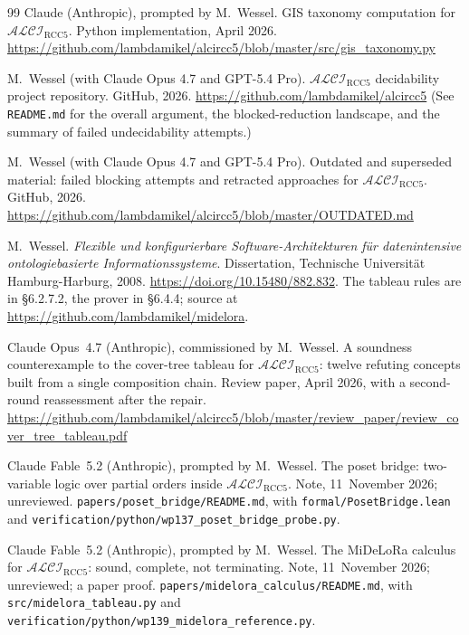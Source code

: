 \documentclass[11pt]{article}
\newcommand{\ALCIRCC}[1]{\mathcal{ALCI}_{\mathrm{RCC#1}}}
\theoremstyle{plain}
\theoremstyle{definition}
\begin{document}
\begin{thebibliography}{99}
Claude (Anthropic), prompted by M.\ Wessel.
\newblock GIS taxonomy computation for $\ALCIRCC{5}$.
\newblock Python implementation, April 2026.
\newblock \url{https://github.com/lambdamikel/alcircc5/blob/master/src/gis_taxonomy.py}


M.\ Wessel (with Claude Opus 4.7 and GPT-5.4 Pro).
\newblock $\ALCIRCC{5}$ decidability project repository.
\newblock GitHub, 2026.
\newblock \url{https://github.com/lambdamikel/alcircc5}
\newblock (See \texttt{README.md} for the overall argument, the
  blocked-reduction landscape, and the summary of failed
  undecidability attempts.)

M.\ Wessel (with Claude Opus 4.7 and GPT-5.4 Pro).
\newblock Outdated and superseded material: failed blocking
  attempts and retracted approaches for $\ALCIRCC{5}$.
\newblock GitHub, 2026.
\newblock \url{https://github.com/lambdamikel/alcircc5/blob/master/OUTDATED.md}

M.\ Wessel.
\newblock \emph{Flexible und konfigurierbare Software-Architekturen f\"ur
  datenintensive ontologiebasierte Informationssysteme}.
\newblock Dissertation, Technische Universit\"at Hamburg-Harburg, 2008.
\newblock \url{https://doi.org/10.15480/882.832}. The tableau rules are in
  \S6.2.7.2, the prover in \S6.4.4; source at
  \url{https://github.com/lambdamikel/midelora}.

Claude Opus~4.7 (Anthropic), commissioned by M.\ Wessel.
\newblock A soundness counterexample to the cover-tree tableau for
  $\ALCIRCC{5}$: twelve refuting concepts built from a single composition
  chain.
\newblock Review paper, April 2026, with a second-round reassessment after
  the repair.
\newblock \url{https://github.com/lambdamikel/alcircc5/blob/master/review_paper/review_cover_tree_tableau.pdf}

Claude Fable~5.2 (Anthropic), prompted by M.\ Wessel.
\newblock The poset bridge: two-variable logic over partial orders inside
  $\ALCIRCC{5}$.
\newblock Note, 11~November 2026; unreviewed.
\newblock \texttt{papers/poset\_bridge/README.md}, with
  \texttt{formal/PosetBridge.lean} and
  \texttt{verification/python/wp137\_poset\_bridge\_probe.py}.

Claude Fable~5.2 (Anthropic), prompted by M.\ Wessel.
\newblock The MiDeLoRa calculus for $\ALCIRCC{5}$: sound, complete, not
  terminating.
\newblock Note, 11~November 2026; unreviewed; a paper proof.
\newblock \texttt{papers/midelora\_calculus/README.md}, with
  \texttt{src/midelora\_tableau.py} and
  \texttt{verification/python/wp139\_midelora\_reference.py}.


\end{thebibliography}
\end{document}
